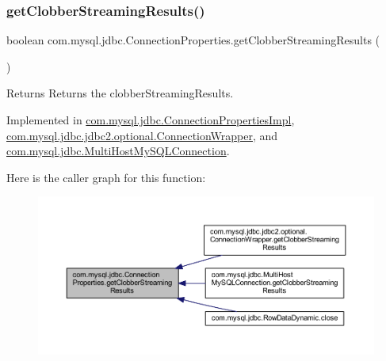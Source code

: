 \subsubsection{\texorpdfstring{get\+Clobber\+Streaming\+Results()}{getClobberStreamingResults()}}
{\footnotesize\ttfamily boolean com.\+mysql.\+jdbc.\+Connection\+Properties.\+get\+Clobber\+Streaming\+Results (\begin{DoxyParamCaption}{ }\end{DoxyParamCaption})}

\begin{DoxyReturn}{Returns}
Returns the clobber\+Streaming\+Results. 
\end{DoxyReturn}


Implemented in \mbox{\hyperlink{classcom_1_1mysql_1_1jdbc_1_1_connection_properties_impl_a1b466ed0206073ffd62f5aa41ce6acfd}{com.\+mysql.\+jdbc.\+Connection\+Properties\+Impl}}, \mbox{\hyperlink{classcom_1_1mysql_1_1jdbc_1_1jdbc2_1_1optional_1_1_connection_wrapper_a66698db6904b10d47dabdfcee7ba799e}{com.\+mysql.\+jdbc.\+jdbc2.\+optional.\+Connection\+Wrapper}}, and \mbox{\hyperlink{classcom_1_1mysql_1_1jdbc_1_1_multi_host_my_s_q_l_connection_afb9da2d46c615f07e7e897ca380f1cf9}{com.\+mysql.\+jdbc.\+Multi\+Host\+My\+S\+Q\+L\+Connection}}.

Here is the caller graph for this function\+:\nopagebreak
\begin{figure}[H]
\begin{center}
\leavevmode
\includegraphics[width=350pt]{interfacecom_1_1mysql_1_1jdbc_1_1_connection_properties_a8097aba9e8a5a513b9dec2c4bfb04fd2_icgraph}
\end{center}
\end{figure}
\mbox{\label{interfacecom_1_1mysql_1_1jdbc_1_1_connection_properties_ad1204db6592b3e0cfa702d4f6abed586}} 
